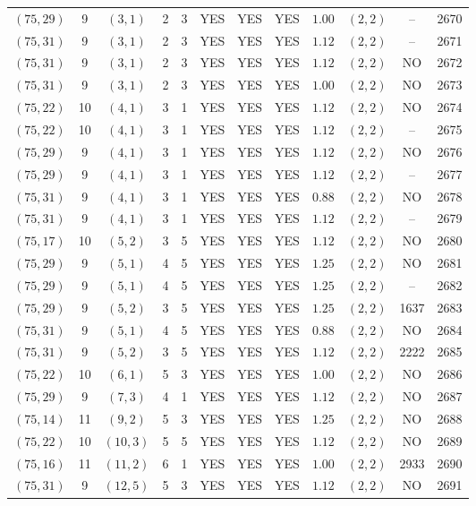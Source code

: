 \begin{longtable}{|c|c|c|c|c|c|c|c|c|c|c|c|}
$(75,29)$ & 9 & $(3,1)$ & 2 & 3 & YES & YES & YES & $1.00$ & $(2,2)$ & -- & 2670\\
$(75,31)$ & 9 & $(3,1)$ & 2 & 3 & YES & YES & YES & $1.12$ & $(2,2)$ & -- & 2671\\
$(75,31)$ & 9 & $(3,1)$ & 2 & 3 & YES & YES & YES & $1.12$ & $(2,2)$ & NO & 2672\\
$(75,31)$ & 9 & $(3,1)$ & 2 & 3 & YES & YES & YES & $1.00$ & $(2,2)$ & NO & 2673\\
$(75,22)$ & 10 & $(4,1)$ & 3 & 1 & YES & YES & YES & $1.12$ & $(2,2)$ & NO & 2674\\
$(75,22)$ & 10 & $(4,1)$ & 3 & 1 & YES & YES & YES & $1.12$ & $(2,2)$ & -- & 2675\\
$(75,29)$ & 9 & $(4,1)$ & 3 & 1 & YES & YES & YES & $1.12$ & $(2,2)$ & NO & 2676\\
$(75,29)$ & 9 & $(4,1)$ & 3 & 1 & YES & YES & YES & $1.12$ & $(2,2)$ & -- & 2677\\
$(75,31)$ & 9 & $(4,1)$ & 3 & 1 & YES & YES & YES & $0.88$ & $(2,2)$ & NO & 2678\\
$(75,31)$ & 9 & $(4,1)$ & 3 & 1 & YES & YES & YES & $1.12$ & $(2,2)$ & -- & 2679\\
$(75,17)$ & 10 & $(5,2)$ & 3 & 5 & YES & YES & YES & $1.12$ & $(2,2)$ & NO & 2680\\
$(75,29)$ & 9 & $(5,1)$ & 4 & 5 & YES & YES & YES & $1.25$ & $(2,2)$ & NO & 2681\\
$(75,29)$ & 9 & $(5,1)$ & 4 & 5 & YES & YES & YES & $1.25$ & $(2,2)$ & -- & 2682\\
$(75,29)$ & 9 & $(5,2)$ & 3 & 5 & YES & YES & YES & $1.25$ & $(2,2)$ & 1637 & 2683\\
$(75,31)$ & 9 & $(5,1)$ & 4 & 5 & YES & YES & YES & $0.88$ & $(2,2)$ & NO & 2684\\
$(75,31)$ & 9 & $(5,2)$ & 3 & 5 & YES & YES & YES & $1.12$ & $(2,2)$ & 2222 & 2685\\
$(75,22)$ & 10 & $(6,1)$ & 5 & 3 & YES & YES & YES & $1.00$ & $(2,2)$ & NO & 2686\\
$(75,29)$ & 9 & $(7,3)$ & 4 & 1 & YES & YES & YES & $1.12$ & $(2,2)$ & NO & 2687\\
$(75,14)$ & 11 & $(9,2)$ & 5 & 3 & YES & YES & YES & $1.25$ & $(2,2)$ & NO & 2688\\
$(75,22)$ & 10 & $(10,3)$ & 5 & 5 & YES & YES & YES & $1.12$ & $(2,2)$ & NO & 2689\\
$(75,16)$ & 11 & $(11,2)$ & 6 & 1 & YES & YES & YES & $1.00$ & $(2,2)$ & 2933 & 2690\\
$(75,31)$ & 9 & $(12,5)$ & 5 & 3 & YES & YES & YES & $1.12$ & $(2,2)$ & NO & 2691\\

\end{longtable}
